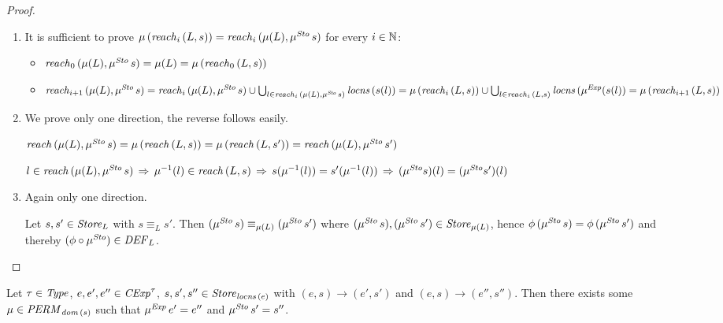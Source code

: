 \documentclass[12pt,a4paper]{report}
\newcommand{\CExp}{\nstyle{CExp}}
\newcommand{\Sto}{\nstyle{Sto}}
\newcommand{\DEF}{\nstyle{DEF}}
\newcommand{\PERM}{\nstyle{PERM}}
\begin{document}
\begin{proof} \
  \begin{enumerate}
    \item It is sufficient to prove $\mu\,(\reachn{i}{L}{s}) = \reachn{i}{\mu(L)}{\mu^\Sto\,s}$ for every $i\in\mathbb N$:
          \begin{itemize}
            \item $\reachn{0}{\mu(L)}{\mu^\Sto\,s} = \mu(L) = \mu\,(\reachn{0}{L}{s})$

            \item $\reachn{i+1}{\mu(L)}{\mu^\Sto\,s} \\
                  = \reachn{i}{\mu(L)}{\mu^\Sto\,s}
                    \cup \bigcup_{l\in\reachn{i}{\mu(L)}{\mu^\Sto\,s}} \locns{s(l)} \\
                  = \mu\,(\reachn{i}{L}{s})
                    \cup \bigcup_{l\in\reachn{i}{L}{s}} \locns{\mu^\Exp(s(l)} \\
                  = \mu\,(\reachn{i+1}{L}{s})$
          \end{itemize}

    \item We prove only one direction, the reverse follows easily.

          $\reach{\mu(L)}{\mu^\Sto\,s} = \mu\,(\reach{L}{s}) = \mu\,(\reach{L}{s'}) = \reach{\mu(L)}{\mu^\Sto\,s'}$

          $l \in \reach{\mu(L)}{\mu^\Sto\,s} \\
            \,\Rightarrow\,
            \mu^{-1}(l) \in \reach{L}{s} \\
            \,\Rightarrow\,
            s(\mu^{-1}(l)) = s'(\mu^{-1}(l)) \\
            \,\Rightarrow\,
            (\mu^\Sto s)(l) = (\mu^\Sto s')(l)$

    \item Again only one direction.

          Let $s,s'\in\mathit{Store}_L$ with $s \equiv_L s'$. Then $(\mu^\Sto\,s) \equiv_{\mu(L)} (\mu^\Sto\,s')$
          where $(\mu^\Sto\,s),(\mu^\Sto\,s')\in\Store_{\mu(L)}$, hence $\phi\,(\mu^\Sto\,s)=\phi\,(\mu^\Sto\,s')$
          and thereby $(\phi \circ \mu^\Sto) \in \DEF_L$.
  \end{enumerate}
\end{proof}

\begin{lemma} \label{lemma:Existance_of_permutations_for_small_steps}
  Let $\tau\in\mathit{Type}$, $e,e',e''\in\CExp^\tau$, $s,s',s''\in\mathit{Store}_{\mathit{locns}\,(e)}$ with
  $(e,s) \to (e',s')$ and $(e,s) \to (e'',s'')$. Then there exists some $\mu \in \PERM_{\dom{s}}$
  such that $\mu^{\mathit{Exp}}\,e' = e''$ and $\mu^\Sto\,s' = s''$.
\end{lemma}
\end{document}
